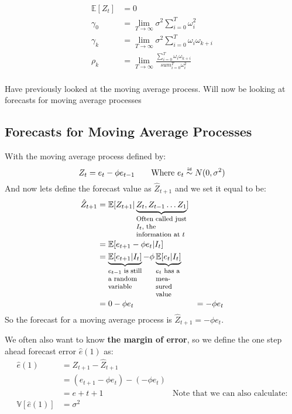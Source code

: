 \begin{equation*}
    \begin{aligned}
        \mathbb{E}[Z_t] &= 0 \\
        \gamma_0 &= \lim_{T\to\infty} \sigma^2 \sum_{i=0}^{T} \omega_i^2 \\
        \gamma_k &= \lim_{T\to\infty} \sigma^2 \sum_{i=0}^{T} \omega_i
        \omega_{k+i} \\
        \rho_k &= \lim_{T\to\infty} \frac{\sum_{i=0}^{T} \omega_i
        \omega_{k+i}}{sum_{i=0}^{T} \omega_i^2} \\
    \end{aligned}
\end{equation*}


Have previously looked at the moving average process.
Will now be looking at forecasts for moving average processes
\subsection{Forecasts for Moving Average Processes}
With the moving average process defined by:
\begin{equation*}
    Z_t = e_t - \phi e_{t-1} \qquad \text{Where $e_t \iid N(0, \sigma^2)$}
\end{equation*}
And now lets define the forecast value as $\hat{Z}_{t+1}$ and we set it equal
to be:
 \begin{equation*}
     \begin{aligned}
         \hat{Z}_{t+1} &= \mathbb{E}[Z_{t+1} | \explain{Z_t, Z_{t-1} \dots
         Z_1}{Often called just $I_t$, the information at  $t$}]  \\
                       &= \mathbb{E}[e_{t+1} - \phi e_t | I_t]  \\
                       &= \explain{\mathbb{E}[e_{t+1} | I_t]}{$e_{t-1}$ is
                       still a random variable} - \phi \explain{\mathbb{E}[e_t
                   | I_t]}{$e_t$ has a measured value}  \\
                       &= 0 - \phi e_t
                       &= -\phi e_t
     \end{aligned}
\end{equation*}
So the forecast for a moving average process is $ \hat{Z}_{t+1} = -\phi e_t$.

We often also want to know \textbf{the margin of error}, so we define the one
step ahead forecast error $ \hat{e}(1)$ as:
\begin{equation*}
    \begin{aligned}
        \hat{e}(1) &= Z_{t+1} - \hat{Z}_{t+1} \\
                   &= (e_{t+1} - \phi e_t) - (- \phi e_t) \\
                   &= e+{t+1}
                   &\text{Note that we can also calculate:}\\
        \mathbb{V}[ \hat{e}(1)] &= \sigma^2 \\
    \end{aligned}
\end{equation*}

